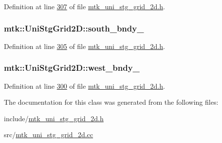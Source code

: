 Definition at line \hyperlink{mtk__uni__stg__grid__2d_8h_source_l00307}{307} of file \hyperlink{mtk__uni__stg__grid__2d_8h_source}{mtk\+\_\+uni\+\_\+stg\+\_\+grid\+\_\+2d.\+h}.

\hypertarget{classmtk_1_1UniStgGrid2D_ac228c81fad7f4feeae93fb3c09d7e175}{
\subsubsection[{south\+\_\+bndy\+\_\+}]{ mtk\+::\+Uni\+Stg\+Grid2\+D\+::south\+\_\+bndy\+\_\+\hspace{0.3cm}{\ttfamily [private]}}}\label{classmtk_1_1UniStgGrid2D_ac228c81fad7f4feeae93fb3c09d7e175}


Definition at line \hyperlink{mtk__uni__stg__grid__2d_8h_source_l00305}{305} of file \hyperlink{mtk__uni__stg__grid__2d_8h_source}{mtk\+\_\+uni\+\_\+stg\+\_\+grid\+\_\+2d.\+h}.

\hypertarget{classmtk_1_1UniStgGrid2D_a59c42d8099a017bc8a082fddc1e5606c}{
\subsubsection[{west\+\_\+bndy\+\_\+}]{ mtk\+::\+Uni\+Stg\+Grid2\+D\+::west\+\_\+bndy\+\_\+\hspace{0.3cm}{\ttfamily [private]}}}\label{classmtk_1_1UniStgGrid2D_a59c42d8099a017bc8a082fddc1e5606c}


Definition at line \hyperlink{mtk__uni__stg__grid__2d_8h_source_l00300}{300} of file \hyperlink{mtk__uni__stg__grid__2d_8h_source}{mtk\+\_\+uni\+\_\+stg\+\_\+grid\+\_\+2d.\+h}.



The documentation for this class was generated from the following files\+:\begin{DoxyCompactItemize}
\item 
include/\hyperlink{mtk__uni__stg__grid__2d_8h}{mtk\+\_\+uni\+\_\+stg\+\_\+grid\+\_\+2d.\+h}\item 
src/\hyperlink{mtk__uni__stg__grid__2d_8cc}{mtk\+\_\+uni\+\_\+stg\+\_\+grid\+\_\+2d.\+cc}\end{DoxyCompactItemize}
